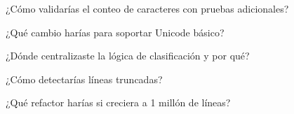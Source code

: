 
\begin{DoxyEnumerate}
\item ¿\+Cómo validarías el conteo de caracteres con pruebas adicionales?
\item ¿\+Qué cambio harías para soportar Unicode básico?
\item ¿\+Dónde centralizaste la lógica de clasificación y por qué?
\item ¿\+Cómo detectarías líneas truncadas?
\item ¿\+Qué refactor harías si creciera a 1 millón de líneas? 
\end{DoxyEnumerate}